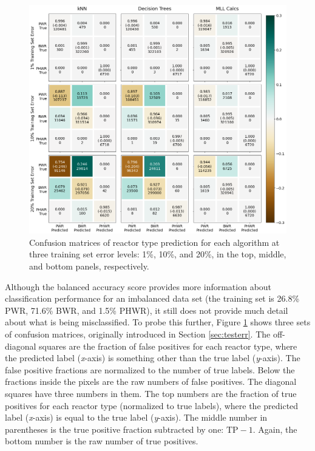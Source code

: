\begin{figure}[!htb]
  \centering
  \includegraphics[width=\textwidth]{./chapters/exp1/confusion_matrix_nuc29_3errs.png}
  \caption[Confusion matrices of reactor type classification]
          {Confusion matrices of reactor type prediction for each algorithm 
           at three training set error levels: 1\%, 10\%, and 20\%, in the 
           top, middle, and bottom panels, respectively.}
  \label{fig:cm_nuc29}
\end{figure}

Although the balanced accuracy score provides more information about
classification performance for an imbalanced data set (the training set is
26.8\% \gls{PWR}, 71.6\% \gls{BWR}, and 1.5\% \gls{PHWR}), it still does not
provide much detail about what is being misclassified. To probe this further,
Figure \ref{fig:cm_nuc29} shows three sets of confusion matrices, originally
introduced in Section \ref{sec:testerr}.  The off-diagonal squares are the
fraction of false positives for each reactor type, where the predicted label
(\textit{x}-axis) is something other than the true label (\textit{y}-axis).
The false positive fractions are normalized to the number of true labels.
Below the fractions inside the pixels are the raw numbers of false positives.
The diagonal squares have three numbers in them. The top numbers are the
fraction of true positives for each reactor type (normalized to true labels),
where the predicted label (\textit{x}-axis) is equal to the true label
(\textit{y}-axis).  The middle number in parentheses is the true positive
fraction subtracted by one: $\text{TP} - 1$.  Again, the bottom number is the
raw number of true positives.  

